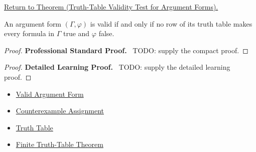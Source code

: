 \newpage
{}
\label{prf:truth-table-validity-test-argument-forms-propositional-logic}

\begin{remark*}[Return]
\hyperref[thm:truth-table-validity-test-argument-forms-propositional-logic]{Return to Theorem (Truth-Table Validity Test for Argument Forms).}
\end{remark*}

\begin{theorem*}
An argument form \((\Gamma,\varphi)\) is valid if and only if no row of its truth
table makes every formula in \(\Gamma\) true and \(\varphi\) false.
\end{theorem*}

\begin{proof}
\textbf{Professional Standard Proof.}~
TODO: supply the compact proof.
\end{proof}

\begin{proof}
\textbf{Detailed Learning Proof.}~
TODO: supply the detailed learning proof.
\end{proof}

\begin{remark*}
\end{remark*}

\begin{dependencies}
\begin{itemize}
  \item \hyperref[def:valid-argument-form-propositional-logic]{Valid Argument Form}
  \item \hyperref[def:counterexample-assignment-propositional-logic]{Counterexample Assignment}
  \item \hyperref[def:truth-table-propositional-logic]{Truth Table}
  \item \hyperref[thm:finite-truth-table-propositional-logic]{Finite Truth-Table Theorem}
\end{itemize}
\end{dependencies}

\clearpage
